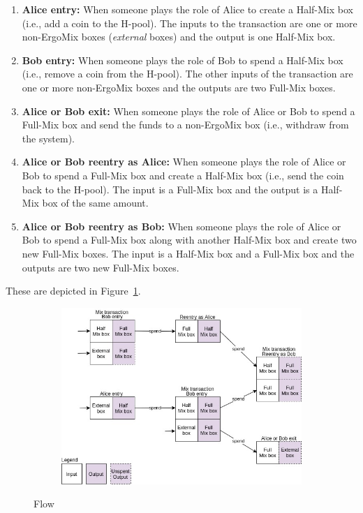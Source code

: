 \documentclass[11pt]{article}
\newcommand{\mixname}{ErgoMix\xspace}
\begin{document}
\begin{enumerate}
    \item \textbf{Alice entry:} When someone plays the role of Alice to create a Half-Mix box (i.e., add a coin to the H-pool). The inputs to the transaction are one or more non-\mixname boxes ({\em external} boxes) and the output is one Half-Mix box. 
    \item \textbf{Bob entry:} When someone plays the role of Bob to spend a Half-Mix box (i.e., remove a coin from the H-pool). The other inputs of the transaction are one or more non-\mixname boxes and the outputs are two Full-Mix boxes. 
    \item \textbf{Alice or Bob exit:} When someone plays the role of Alice or Bob to spend a Full-Mix box and send the funds to a non-\mixname box (i.e., withdraw from the system). 
    \item \textbf{Alice or Bob reentry as Alice:} When someone plays the role of Alice or Bob to spend a Full-Mix box and create a Half-Mix box (i.e., send the coin back to the H-pool). The input is a Full-Mix box and the output is a Half-Mix box of the same amount.
    \item \textbf{Alice or Bob reentry as Bob:} When someone plays the role of Alice or Bob to spend a Full-Mix box along with another Half-Mix box and create two new Full-Mix boxes. The input is a Half-Mix box and a Full-Mix box and the outputs are two new Full-Mix boxes.
\end{enumerate}

These are depicted in Figure~\ref{fig:ergomixflow}.

\begin{figure}[h]
	\centering
	\begin{subfigure}{0.7\textwidth}
		\centering
		\includegraphics[width=\linewidth]{ErgoMixFlow.jpg}
	\end{subfigure}
	\caption{\algname Flow}
\label{fig:ergomixflow}
\end{figure}
\end{document}
